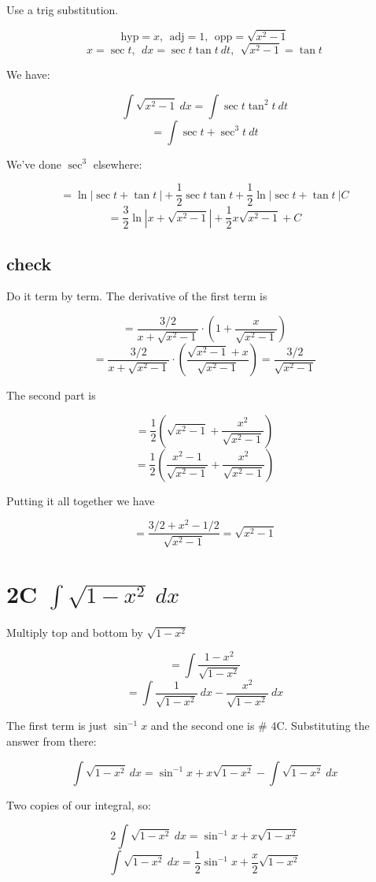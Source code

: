 \documentclass[11pt, oneside]{article}
\begin{document}
Use a trig substitution.

\[ \text{hyp} = x, \ \ \text{adj} = 1, \ \ \text{opp} = \sqrt{x^2-1}  \]
\[ x = \sec t, \ \ dx = \sec t \tan t \ dt, \ \ \sqrt{x^2-1} = \tan t \]

We have:

\[ \int \sqrt{x^2 - 1} \ dx = \int \sec t \tan^2 t \ dt \]
\[ = \int \sec t + \sec^3 t \ dt \]

We've done $\sec^3$ elsewhere:

\[ = \ln |\sec t + \tan t \ | +  \frac{1}{2} \sec t \tan t +   \frac{1}{2} \ln | \sec t +  \tan t \ |  C \]
\[ = \frac{3}{2} \ln |x + \sqrt{x^2-1}| + \frac{1}{2} x \sqrt{x^2-1} + C \]

\subsection*{check}

Do it term by term.  The derivative of the first term is

\[ = \frac{3/2}{x + \sqrt{x^2-1}} \cdot  (1 + \frac{x}{\sqrt{x^2-1}}) \]
\[ = \frac{3/2}{x + \sqrt{x^2-1}} \cdot  (\frac{\sqrt{x^2 - 1} + x}{\sqrt{x^2-1}})  = \frac{3/2}{\sqrt{x^2-1}} \]

The second part is

\[ = \frac{1}{2} (\sqrt{x^2-1} + \frac{x^2}{\sqrt{x^2-1}}) \]
\[ = \frac{1}{2} (\frac{x^2 - 1}{\sqrt{x^2-1}} + \frac{x^2}{\sqrt{x^2-1}}) \]

Putting it all together we have

\[ = \frac{3/2 + x^2 - 1/2}{\sqrt{x^2-1}} = \sqrt{x^2-1}  \]

\section*{2C $\int \sqrt{1 - x^2} \ dx$}

Multiply top and bottom by $\sqrt{1 - x^2}$

\[ = \int \frac{1-x^2}{\sqrt{1 - x^2}} \]
\[ = \int \frac{1}{\sqrt{1 - x^2}} \ dx - \frac{x^2}{\sqrt{1 - x^2}} \ dx \]

The first term is just $\sin^{-1} x$ and the second one is \# 4C.  Substituting the answer from there:

\[ \int \sqrt{1 - x^2} \ dx = \sin^{-1} x + x \sqrt{1-x^2} - \int \sqrt{1-x^2} \ dx \]

Two copies of our integral, so:

\[ 2 \int \sqrt{1 - x^2} \ dx =  \sin^{-1} x + x \sqrt{1-x^2} \]
\[ \int \sqrt{1 - x^2} \ dx = \frac{1}{2} \sin^{-1} x + \frac{x}{2} \sqrt{1-x^2} \]
\end{document}
